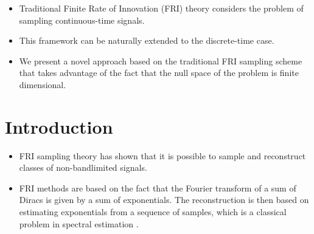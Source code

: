 \documentclass[a0,portrait]{a0poster}
\begin{document}
\begin{multicols}{2} %



\color{Navy} %

\begin{itemize}

\item Traditional Finite Rate of Innovation (FRI) theory considers the problem of sampling continuous-time
signals.

\item This framework can be naturally extended to the discrete-time case.

\item We present a novel approach based on the traditional FRI sampling scheme that takes 
advantage of the fact that the null space of the problem is finite dimensional.



\end{itemize}



\section*{Introduction}

\begin{itemize}

\item FRI sampling theory \cite{vetterli2002,blu2008} has shown that it is possible to sample
and reconstruct classes of non-bandlimited signals.
\item FRI methods are based on the fact that 
the Fourier transform of a sum of Diracs is given by a sum of exponentials.
The reconstruction is then based on estimating exponentials from a sequence of samples, which is a 
classical problem in spectral estimation \cite{stoica2005}. 


\end{itemize}
\end{multicols}
\end{document}
